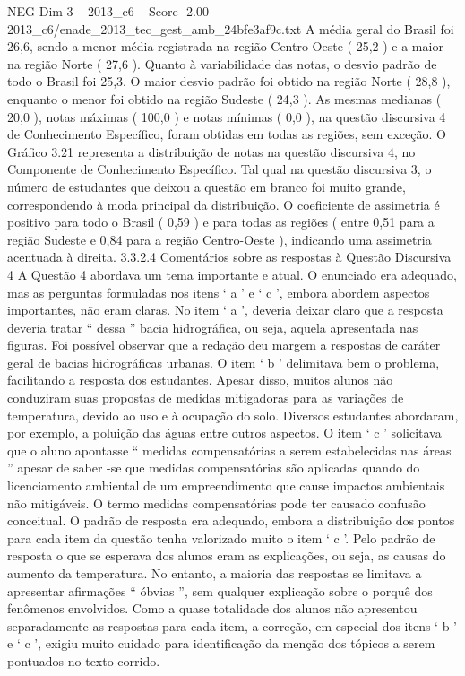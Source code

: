\begin{textsample}{NEG Dim 3 – 2013\_c6 – Score -2.00 – 2013\_c6/enade\_2013\_tec\_gest\_amb\_24bfe3af9c.txt}
A média geral do Brasil foi 26,6, sendo a menor média registrada na região Centro-Oeste ( 25,2 ) e a maior na região Norte ( 27,6 ).
Quanto à variabilidade das notas, o desvio padrão de todo o Brasil foi 25,3.
O maior desvio padrão foi obtido na região Norte ( 28,8 ), enquanto o menor foi obtido na região Sudeste ( 24,3 ).
As mesmas medianas ( 20,0 ), notas máximas ( 100,0 ) e notas mínimas ( 0,0 ), na questão discursiva 4 de Conhecimento Específico, foram obtidas em todas as regiões, sem exceção.
O Gráfico 3.21 representa a distribuição de notas na questão discursiva 4, no Componente de Conhecimento Específico.
Tal qual na questão discursiva 3, o número de estudantes que deixou a questão em branco foi muito grande, correspondendo à moda principal da distribuição.
O coeficiente de assimetria é positivo para todo o Brasil ( 0,59 ) e para todas as regiões ( entre 0,51 para a região Sudeste e 0,84 para a região Centro-Oeste ), indicando uma assimetria acentuada à direita. 3.3.2.4 Comentários sobre as respostas à Questão Discursiva 4 A Questão 4 abordava um tema importante e atual.
O enunciado era adequado, mas as perguntas formuladas nos itens ‘ a ’ e ‘ c ’, embora abordem aspectos importantes, não eram claras.
No item ‘ a ’, deveria deixar claro que a resposta deveria tratar “ dessa ” bacia hidrográfica, ou seja, aquela apresentada nas figuras.
Foi possível observar que a redação deu margem a respostas de caráter geral de bacias hidrográficas urbanas.
O item ‘ b ’ delimitava bem o problema, facilitando a resposta dos estudantes.
Apesar disso, muitos alunos não conduziram suas propostas de medidas mitigadoras para as variações de temperatura, devido ao uso e à ocupação do solo.
Diversos estudantes abordaram, por exemplo, a poluição das águas entre outros aspectos.
O item ‘ c ’ solicitava que o aluno apontasse “ medidas compensatórias a serem estabelecidas nas áreas ” apesar de saber -se que medidas compensatórias são aplicadas quando do licenciamento ambiental de um empreendimento que cause impactos ambientais não mitigáveis.
O termo medidas compensatórias pode ter causado confusão conceitual.
O padrão de resposta era adequado, embora a distribuição dos pontos para cada item da questão tenha valorizado muito o item ‘ c ’.
Pelo padrão de resposta o que se esperava dos alunos eram as explicações, ou seja, as causas do aumento da temperatura.
No entanto, a maioria das respostas se limitava a apresentar afirmações “ óbvias ”, sem qualquer explicação sobre o porquê dos fenômenos envolvidos.
Como a quase totalidade dos alunos não apresentou separadamente as respostas para cada item, a correção, em especial dos itens ‘ b ’ e ‘ c ’, exigiu muito cuidado para identificação da menção dos tópicos a serem pontuados no texto corrido.

\end{textsample}
